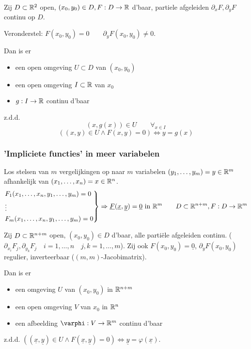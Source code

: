 \documentclass{2wa40summary}
\begin{document}
			 Zij $D \subset \mathbb{R}^2$ open, $ (x_0 , y_0 ) \in D, F:D \rightarrow \mathbb{R} $ d'baar, partiele afgeleiden $ \partial_x F, \partial_y F $ continu op $ D $.
			
			Veronderstel: $ F(x_0, y_0) = 0 \qquad \partial_y F(x_0, y_0)\neq 0 $.
			
			Dan is er 
			\begin{itemize} 
				\item[] een open omgeving $ U \subset D $ van $ (x_0,y_0) $
				\item[] een open omgeving $ I \subset \mathbb{R} $ van $ x_0 $
				\item[] $ g: I \rightarrow \mathbb{R} $ continu d'baar 
			\end{itemize}
			z.d.d.
			\[ (x,g(x)) \in U \qquad \forall_{x \in I} \]
			\[ ((x,y) \in U \wedge F(x,y)=0) \Leftrightarrow y=g(x) \]
			
			
			\subsubsection{'Impliciete functies' in meer variabelen}
				Los stelsen van $m$ vergelijkingen op naar $m$ variabelen $(y_1, \dots ,y_m) = y \in \mathbb{R}^m$ afhankelijk van $ (x_1, \dots , x_n) = x \in \mathbb{R}^n $.
				\[
				\begin{rcases*}
				F_1(x_1,\dots,x_n,y_1,\dots,y_m)=0 \\
				\vdots \\
				F_m(x_1,\dots,x_n,y_1,\dots,y_m)=0
				\end{rcases*} \Rightarrow \underline{F}(\underline{x},\underline{y})=\underline{0} \text{ in } \reals^m \qquad D \subset \reals^{n+m}, F: D \rightarrow \reals^m
				\]
				
				 Zij $ D\subset \mathbb{R}^{n+m} $ open, $ (x_0, y_0) \in D $ d'baar, alle parti\"ele afgeleiden continu. ($ \partial_{x_i}F_j , \partial_{y_k}F_j \quad i=1,\dots,n \quad j,k=1,\dots,m $). Zij ook $ F(x_0, y_0) = \underline{0}$, $ \partial_y F(x_0,y_0) $ regulier, inverteerbaar ($ (m,m) $-Jacobimatrix).
				
				Dan is er \begin{itemize}
					\item[] een omgeving $ U $ van $ (x_0,y_0) $ in $ \mathbb{R}^{n+m} $
					\item[] een open omgeving $V$ van $x_0$ in $\mathbb{R}^n$
					\item[] een afbeelding $ \varphi : V\rightarrow \reals^m $ continu d'baar 
				\end{itemize}
				z.d.d. $ ((\underline{x},\underline{y}) \in U \wedge F(\underline{x},\underline{y})=0) \Leftrightarrow \underline{y}=\varphi (\underline{x}). $
				
\end{document}
